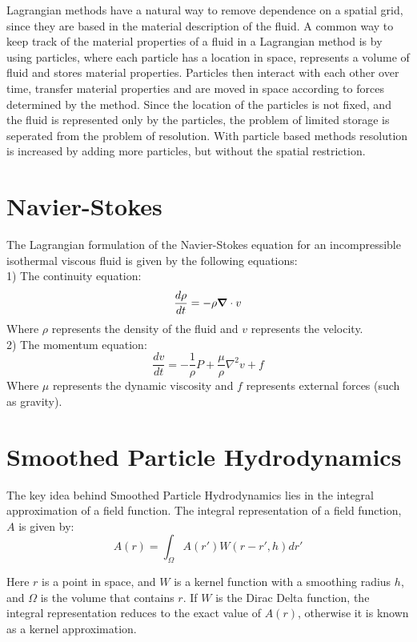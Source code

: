 Lagrangian methods have a natural way to remove dependence on a spatial grid,
since they are based in the material description of the fluid. A common way to
keep track of the material properties of a fluid in a Lagrangian method is by
using particles, where each particle has a location in space, represents a
volume of fluid and stores material properties. Particles then interact with
each other over time, transfer material properties and are moved in space
according to forces determined by the method. Since the location of the
particles is not fixed, and the fluid is represented only by the particles, the
problem of limited storage is seperated from the problem of resolution. With
particle based methods resolution is increased by adding more particles, but
without the spatial restriction.



\section{Navier-Stokes}

The Lagrangian formulation of the Navier-Stokes equation for an incompressible
isothermal viscous fluid is given by the following equations: \\
1) The continuity equation:
$$
\frac{d\rho}{dt} = -\rho \mbox{\boldmath$ \nabla $} \cdot v
$$
Where $\rho$ represents the density of the fluid and $v$ represents the velocity.\\


2) The momentum equation:
$$
\frac{dv}{dt} = -\frac{1}{\rho}P + \frac{\mu}{\rho} \nabla^2 v + f
$$
Where $\mu$ represents the dynamic viscosity and $f$ represents external forces (such as gravity).


\section{Smoothed Particle Hydrodynamics}

The key idea behind Smoothed Particle Hydrodynamics lies in the integral
approximation of a field function. The integral representation of a field
function, $A$ is given by: 
$$
A(r) = \int_\Omega A(r')W(r-r', h)dr'
$$

Here $r$ is a point in space, and $W$ is a kernel function with a smoothing radius
$h$, and $\Omega$ is the volume that contains $r$. If $W$ is the Dirac Delta
function, the integral representation reduces to the exact value of $A(r)$,
otherwise it is known as a kernel approximation.


